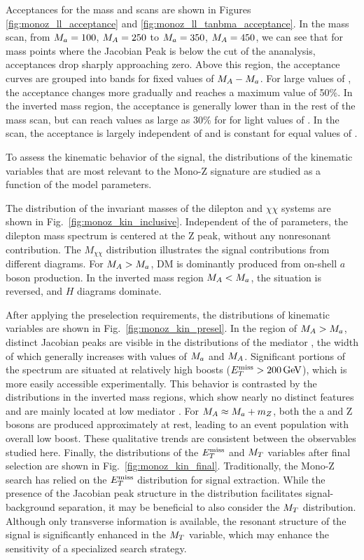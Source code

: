 Acceptances for the mass and \tanb scans are shown in Figures \ref{fig:monoz_ll_acceptance} and \ref{fig:monoz_ll_tanbma_acceptance}.  
In the mass scan, from $M_{a}=100$, $M_{A}=250$ to $M_{a}=350$, $M_{A}=450$, we can see that for mass points where the Jacobian Peak is below the \MET cut of the ananalysis, acceptances drop sharply approaching zero.  Above this region, the acceptance curves are grouped into bands for fixed values of $M_{A}-M_{a}$.  For large values of \mA, the acceptance changes more gradually and reaches a maximum value of 50\%.  In the inverted mass region, the acceptance is generally lower than in the rest of the mass scan, but can reach values as large as 30\% for for light values of \mA.  In the \tanb scan, the acceptance is largely independent of \tanb and is constant for equal values of \ma.  

To assess the kinematic behavior of the signal, the distributions of the kinematic variables that are most relevant to the Mono-Z signature are studied as a function of the model parameters.

The distribution of the invariant masses of the dilepton and $\chi\chi$ systems are shown in Fig.~\ref{fig:monoz_kin_inclusive}. Independent of the of parameters, the dilepton mass spectrum is centered at the Z peak, without any nonresonant contribution. The $M_{\chi\chi}$ distribution illustrates the signal contributions from different diagrams. For $M_{A}>M_{a}$, DM is dominantly produced from on-shell $a$ boson production. In the inverted mass region $M_{A}<M_{a}$, the situation is reversed, and $H$ diagrams dominate.

After applying the preselection requirements, the distributions of kinematic variables are shown in Fig.~\ref{fig:monoz_kin_presel}. In the region of $M_{A}>M_{a}$, distinct Jacobian peaks are visible in the distributions of the mediator \pt, the width of which generally increases with values of $M_{a}$ and $M_{A}$. Significant portions of the spectrum are situated at relatively high boosts ($\MET>\unit[200]{GeV}$), which is more easily accessible experimentally.
This behavior is contrasted by the distributions in the inverted mass regions, which show nearly no distinct features and are mainly located at low mediator \pt. For $M_{A}\approx M_{a}+m_{Z}$, both the a and Z bosons are produced approximately at rest, leading to an event population with overall low boost. These qualitative trends are consistent between the observables studied here.
Finally, the distributions of the $E_T^\mathrm{miss}$ and $M_{T}$ variables after final selection are shown in Fig.~\ref{fig:monoz_kin_final}. Traditionally, the Mono-Z search has relied on the $E_T^\mathrm{miss}$ distribution for signal extraction. While the presence of the Jacobian peak structure in the distribution facilitates signal-background separation, it may be beneficial to also consider the $M_{T}$ distribution. Although only transverse information is available, the resonant structure of the signal is significantly enhanced in the $M_{T}$ variable, which may enhance the sensitivity of a specialized search strategy.

